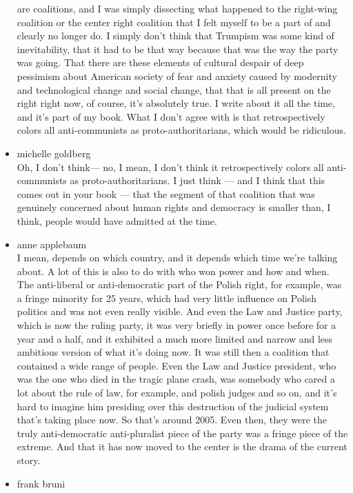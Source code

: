 \begin{itemize}
  are coalitions, and I was simply dissecting what happened to the
  right-wing coalition or the center right coalition that I felt myself
  to be a part of and clearly no longer do. I simply don't think that
  Trumpism was some kind of inevitability, that it had to be that way
  because that was the way the party was going. That there are these
  elements of cultural despair of deep pessimism about American society
  of fear and anxiety caused by modernity and technological change and
  social change, that that is all present on the right right now, of
  course, it's absolutely true. I write about it all the time, and it's
  part of my book. What I don't agree with is that retrospectively
  colors all anti-communists as proto-authoritarians, which would be
  ridiculous.
\item
  michelle goldberg\\
  Oh, I don't think--- no, I mean, I don't think it retrospectively
  colors all anti-communists as proto-authoritarians. I just think ---
  and I think that this comes out in your book --- that the segment of
  that coalition that was genuinely concerned about human rights and
  democracy is smaller than, I think, people would have admitted at the
  time.
\item
  anne applebaum\\
  I mean, depends on which country, and it depends which time we're
  talking about. A lot of this is also to do with who won power and how
  and when. The anti-liberal or anti-democratic part of the Polish
  right, for example, was a fringe minority for 25 years, which had very
  little influence on Polish politics and was not even really visible.
  And even the Law and Justice party, which is now the ruling party, it
  was very briefly in power once before for a year and a half, and it
  exhibited a much more limited and narrow and less ambitious version of
  what it's doing now. It was still then a coalition that contained a
  wide range of people. Even the Law and Justice president, who was the
  one who died in the tragic plane crash, was somebody who cared a lot
  about the rule of law, for example, and polish judges and so on, and
  it's hard to imagine him presiding over this destruction of the
  judicial system that's taking place now. So that's around 2005. Even
  then, they were the truly anti-democratic anti-pluralist piece of the
  party was a fringe piece of the extreme. And that it has now moved to
  the center is the drama of the current story.
\item
  frank bruni\\

\end{itemize}
